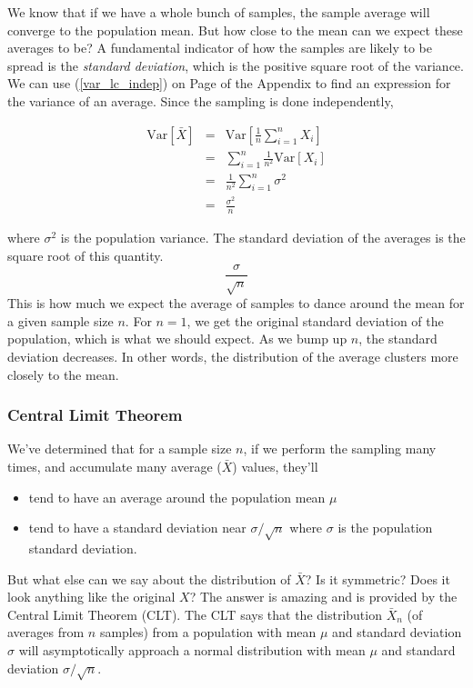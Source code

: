 \documentclass[]{article}
\begin{document}
We know that if we have a whole bunch of samples, the
sample average will converge to the population mean.
But how close to the mean can we expect these averages
to be?  A fundamental indicator of how the samples are
likely to be spread is the \emph{standard deviation},
which is the positive square root of the variance.
We can use (\ref{var_lc_indep}) on Page 
\pageref{var_lc_indep} of the Appendix
to find an expression for the variance of an average.
Since the sampling is done independently,

\begin{eqnarray}
\mbox{Var}[\bar{X}] &= &\mbox{Var}\left[ \frac{1}{n} 
         \sum_{i=1}^n X_i \right] \nonumber \\
  &= &\sum_{i=1}^n  \frac{1}{n^2} \mbox{Var}[X_i] \nonumber \\
  &= &\frac{1}{n^2} \sum_{i=1}^n  \sigma^2 \nonumber \\
  &= &\frac{\sigma^2}{n} \label{sample_var1}
\end{eqnarray}

where $\sigma^2$ is the population variance.
The standard deviation of the averages is the square root of
this quantity.
$$
\frac{\sigma}{\sqrt{n}}
$$
This is how much
we expect the average of samples to dance around the mean for
a given sample size $n$.  For $n=1$, we get the original standard
deviation of the population, which is what we should expect.  As
we bump up $n$, the standard deviation decreases.  In other words,
the distribution of the average clusters more closely to the mean.

\subsubsection{Central Limit Theorem}

We've determined that for a sample size $n$, if we perform
the sampling many times, and accumulate many average
($\bar{X}$) values, they'll

\begin{itemize}
\item tend to have an average around the population mean $\mu$
\item tend to have a standard deviation near $\sigma/\sqrt{n}$
   where $\sigma$ is the population standard deviation.
\end{itemize}

But what else can we say about the distribution of $\bar{X}$?
Is it symmetric?  Does it look anything like the original $X$?
The answer is amazing and is provided by the Central Limit
Theorem (CLT).  The CLT says that the distribution $\bar{X}_n$
(of averages from $n$ samples) from a  
population with mean $\mu$ and standard deviation $\sigma$ will
asymptotically approach a normal distribution with mean $\mu$
and standard deviation $\sigma/\sqrt{n}$.
\end{document}
